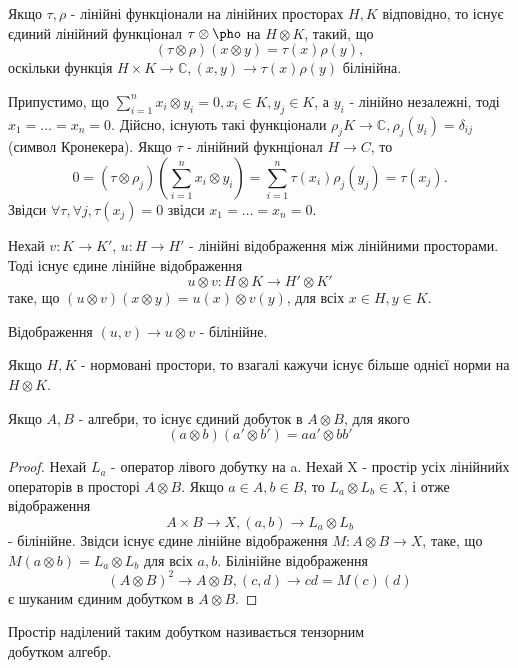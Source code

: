 Якщо $\tau, \rho$ - лінійні функціонали на лінійних просторах $H,K$ відповідно, то існує єдиний лінійний функціонал
$\tau \otimes \pho$ на $H \otimes K$, такий, що
\begin{equation*}
    (\tau \otimes \rho)(x \otimes y) = \tau(x)\rho(y),
\end{equation*}
оскільки функція $H \times K \to \mathbb{C}, (x,y) \to \tau(x)\rho(y)$ білінійна.

Припустимо, що $\sum_{i=1}^n x_i \otimes y_i = 0, x_i \in K, y_j \in K$, а $y_i$ - лінійно незалежні, тоді
$x_1 = \dots = x_n = 0$.
Дійсно, існують такі функціонали $\rho_j K \to \mathbb{C}, \rho_j(y_i) = \delta_{ij}$(символ Кронекера).
Якщо $\tau$ - лінійний фукнціонал $H \to C$, то
\begin{equation*}
    0 = (\tau \otimes \rho_j)(\sum_{i=1}^n x_i \otimes y_i) = \sum_{i=1}^n \tau(x_i) \rho_j(y_j) = \tau(x_j).
\end{equation*}
Звідси $\forall \tau, \forall j, \tau(x_j) = 0$ звідси $x_1 = \dots = x_n = 0$.

Нехай $v: K \to K'$, $u: H \to H'$ - лінійні відображення між лінійними просторами.
Тоді існує єдине лінійне відображення
\begin{equation*}
    u \otimes v: H \otimes K \to H' \otimes K'
\end{equation*}
таке, що $(u \otimes v)(x \otimes y) = u(x) \otimes v(y)$, для всіх $x \in H, y \in K$.

Відображення $(u,v) \to u \otimes v$ - білінійне.

Якщо $H, K$ - нормовані простори, то взагалі кажучи існує більше однієї норми на $H \otimes K$.

\begin{lemma}
    Якщо $A,B$ - алгебри, то існує єдиний добуток в $A \otimes B$, для якого
    \begin{equation*}
        (a \otimes b)(a' \otimes b') = aa' \otimes bb'
    \end{equation*}
    \begin{proof}
        Нехай $L_a$ - оператор лівого добутку на a.
        Нехай X - простір усіх лінійнийх операторів в просторі $A \otimes B$.
        Якщо $a \in A,b \in B$, то $L_a \otimes L_b \in X$, і отже відображення
        \begin{equation*}
            A \times B \to X, (a,b) \to L_a \otimes L_b
        \end{equation*}
        - білінійне.
        Звідси існує єдине лінійне відображення $M: A \otimes B \to X$, таке,
        що $M(a \otimes b) = L_a \otimes L_b$ для всіх $a,b$.
        Білінійне відображення
        \begin{equation*}
            (A \otimes B)^2 \to A \otimes B, (c,d) \to cd = M(c)(d)
        \end{equation*}
        є шуканим єдиним добутком в $A \otimes B$.
    \end{proof}
    Простір наділений таким добутком називається тензорним \\ добутком алгебр.
\end{lemma}

